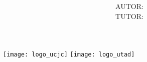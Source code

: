 \begin{titlepage}
    \begin{figure*}
        \texttt{[image: logo\_ucjc]}\hfill%
        \texttt{[image: logo\_utad]}%
        \vspace{1cm}
    \end{figure*}
    \title{
        \large \MakeUppercase{\utadcourse} \\
        \vspace{0.5cm}
        \Huge \MakeUppercase{\utadtitle}
        \vfill
    }
    \author{
        AUTOR: \MakeUppercase{\utadstudent} \\
        TUTOR: \MakeUppercase{\utadtutor}
    }
    \date{}
    \maketitle
\end{titlepage}